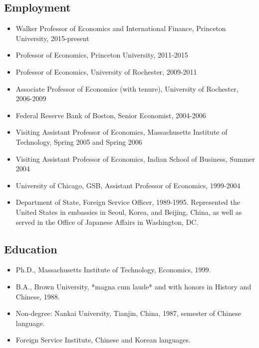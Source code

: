 \documentclass[12pt]{article}
\begin{document}
\thispagestyle{firstpage}
\vspace*{2\baselineskip}
 \afterpage{\aftergroup\restoregeometry}

\subsection*{Employment}

\begin{itemize}[left=0pt .. \parindent, label=]
\item Walker Professor of Economics and International Finance, Princeton
University, 2015-present

\item Professor of Economics, Princeton University, 2011-2015

\item Professor of Economics, University of Rochester, 2009-2011

\item Associate Professor of Economics (with tenure), University of Rochester,
2006-2009

\item Federal Reserve Bank of Boston, Senior Economist, 2004-2006

\item Visiting Assistant Professor of Economics, Massachusetts Institute of
Technology, Spring 2005 and Spring 2006 

\item Visiting Assistant Professor of Economics, Indian School of Business,
Summer 2004

\item University of Chicago, GSB, Assistant Professor of Economics, 1999-2004

\item Department of State, Foreign Service Officer, 1989-1995. Represented the
United States in embassies in Seoul, Korea, and Beijing, China, as well
as served in the Office of Japanese Affairs in Washington, DC.

\end{itemize}

\subsection*{Education}

\begin{itemize}[left=0pt .. \parindent, label=]
\item Ph.D., Massachusetts Institute of Technology, Economics, 1999.

\item B.A., Brown University, *magna cum laude* and with honors in History and
Chinese, 1988.

\item Non-degree: Nankai University, Tianjin, China, 1987, semester of Chinese
language.

\item Foreign Service Institute, Chinese and Korean languages.
\end{itemize}
\end{document}
